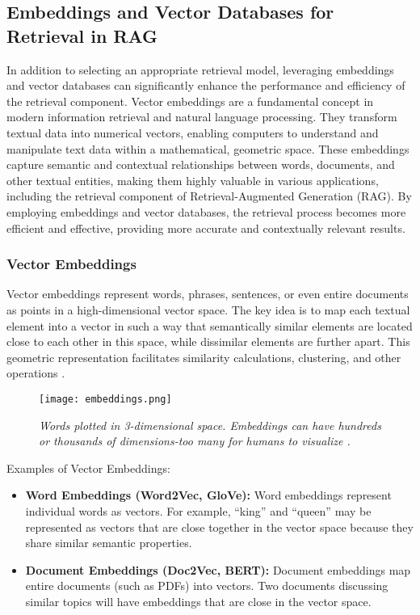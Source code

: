 \subsection{Embeddings and Vector Databases for Retrieval in RAG}

In addition to selecting an appropriate retrieval model, leveraging embeddings and vector databases can significantly enhance the performance and efficiency of the retrieval component. Vector embeddings are a fundamental concept in modern information retrieval and natural language processing. They transform textual data into numerical vectors, enabling computers to understand and manipulate text data within a mathematical, geometric space. These embeddings capture semantic and contextual relationships between words, documents, and other textual entities, making them highly valuable in various applications, including the retrieval component of Retrieval-Augmented Generation (RAG). By employing embeddings and vector databases, the retrieval process becomes more efficient and effective, providing more accurate and contextually relevant results.

\subsubsection*{Vector Embeddings}

Vector embeddings represent words, phrases, sentences, or even entire documents as points in a high-dimensional vector space. The key idea is to map each textual element into a vector in such a way that semantically similar elements are located close to each other in this space, while dissimilar elements are further apart. This geometric representation facilitates similarity calculations, clustering, and other operations \cite{practicalrag}.

\begin{figure}[H]
    \centering
    \texttt{[image: embeddings.png]}
    \caption[Word Embeddings]{
        \it{Words plotted in 3-dimensional space. Embeddings can have hundreds or thousands of dimensions-too many for humans to visualize \cite{googlevectorembeddings}.}
    }
\end{figure}

Examples of Vector Embeddings:

\begin{itemize}
    \item \textbf{Word Embeddings (Word2Vec, GloVe):} Word embeddings represent individual words as vectors. For example, “king” and “queen” may be represented as vectors that are close together in the vector space because they share similar semantic properties.
    \item \textbf{Document Embeddings (Doc2Vec, BERT):} Document embeddings map entire documents (such as PDFs) into vectors. Two documents discussing similar topics will have embeddings that are close in the vector space.
\end{itemize}

